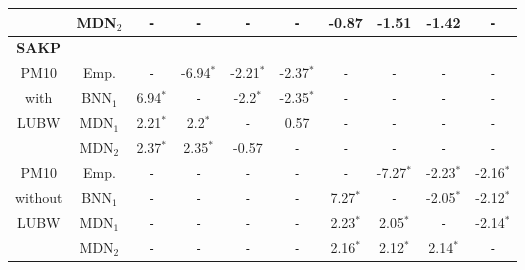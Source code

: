 \begin{tabular}{c|c|cccc||cccc}
  &MDN$_2$&\texttt{\--}&\texttt{\--}&\texttt{\--}&\texttt{\--}&-0.87&-1.51&-1.42&\texttt{\--} \\ 
  \hline     
  \hline     
  \textbf{SAKP}&&&&&&& \\ 
  PM10&Emp.&\texttt{\--}&-6.94$^*$&-2.21$^*$&-2.37$^*$&\texttt{\--}&\texttt{\--}&\texttt{\--}&\texttt{\--} \\ 
  with&BNN$_1$&6.94$^*$&\texttt{\--}&-2.2$^*$&-2.35$^*$&\texttt{\--}&\texttt{\--}&\texttt{\--}&\texttt{\--} \\ 
  LUBW&MDN$_1$&2.21$^*$&2.2$^*$&\texttt{\--}&0.57&\texttt{\--}&\texttt{\--}&\texttt{\--}&\texttt{\--} \\ 
  &MDN$_2$&2.37$^*$&2.35$^*$&-0.57&\texttt{\--}&\texttt{\--}&\texttt{\--}&\texttt{\--}&\texttt{\--} \\ 
  \hline     
  PM10&Emp.&\texttt{\--}&\texttt{\--}&\texttt{\--}&\texttt{\--}&\texttt{\--}&-7.27$^*$&-2.23$^*$&-2.16$^*$ \\ 
  without&BNN$_1$&\texttt{\--}&\texttt{\--}&\texttt{\--}&\texttt{\--}&7.27$^*$&\texttt{\--}&-2.05$^*$&-2.12$^*$ \\ 
  LUBW&MDN$_1$&\texttt{\--}&\texttt{\--}&\texttt{\--}&\texttt{\--}&2.23$^*$&2.05$^*$&\texttt{\--}&-2.14$^*$ \\ 
  &MDN$_2$&\texttt{\--}&\texttt{\--}&\texttt{\--}&\texttt{\--}&2.16$^*$&2.12$^*$&2.14$^*$&\texttt{\--} \\ 
  \hline     
  \hline     
\end{tabular}
